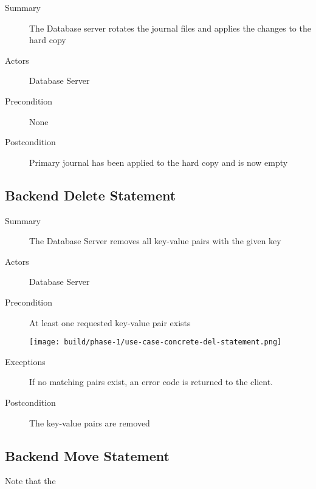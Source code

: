 \documentclass[a4paper]{report}
\begin{document}
	\begin{description}
		\item[Summary] The Database server rotates the journal files and applies the changes to the hard copy
		\item[Actors] Database Server
		\item[Precondition] None

		\begin{center}
		\end{center}

		\item[Postcondition] Primary journal has been applied to the hard copy and is now empty
	\end{description}

	\pagebreak
	
	\subsection{Backend Delete Statement}

	\begin{description}
		\item[Summary] The Database Server removes all key-value pairs with the given key
		\item[Actors] Database Server
		\item[Precondition] At least one requested key-value pair exists

		\begin{center}
			\texttt{[image: build/phase-1/use-case-concrete-del-statement.png]}
		\end{center}

		\item[Exceptions] If no matching pairs exist, an error code is returned to the client.
		\item[Postcondition] The key-value pairs are removed
	\end{description}
	
	\pagebreak

	\subsection{Backend Move Statement}

	Note that the 
\end{document}
